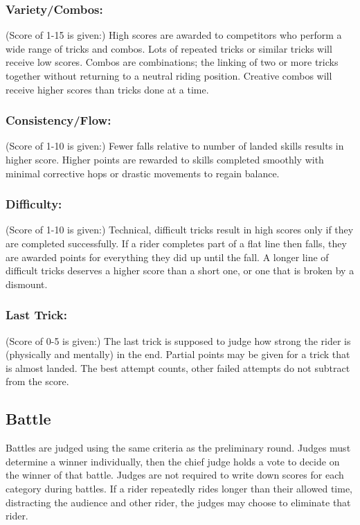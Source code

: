 \subsubsection{Variety/Combos:}
(Score of 1-15 is given:)
High scores are awarded to competitors who perform a wide range of tricks and combos.
Lots of repeated tricks or similar tricks will receive low scores.
Combos are combinations; the linking of two or more tricks together without returning to a neutral riding position.
Creative combos will receive higher scores than tricks done at a time.

\subsubsection{Consistency/Flow:}
(Score of 1-10 is given:)
Fewer falls relative to number of landed skills results in higher score.
Higher points are rewarded to skills completed smoothly with minimal corrective hops or drastic movements to regain balance.

\subsubsection{Difficulty:}
(Score of 1-10 is given:)
Technical, difficult tricks result in high scores only if they are completed successfully.
If a rider completes part of a flat line then falls, they are awarded points for everything they did up until the fall.
A longer line of difficult tricks deserves a higher score than a short one, or one that is broken by a dismount.

\subsubsection{Last Trick:}
(Score of 0-5 is given:)
The last trick is supposed to judge how strong the rider is (physically and mentally) in the end.
Partial points may be given for a trick that is almost landed.
The best attempt counts, other failed attempts do not subtract from the score.

\subsection{Battle \label{subsec:flat-street_flatland-judging-scoring_battle}}
Battles are judged using the same criteria as the preliminary round.
Judges must determine a winner individually, then the chief judge holds a vote to decide on the winner of that battle.
Judges are not required to write down scores for each category during battles.
If a rider repeatedly rides longer than their allowed time, distracting the audience and other rider, the judges may choose to eliminate that rider.

